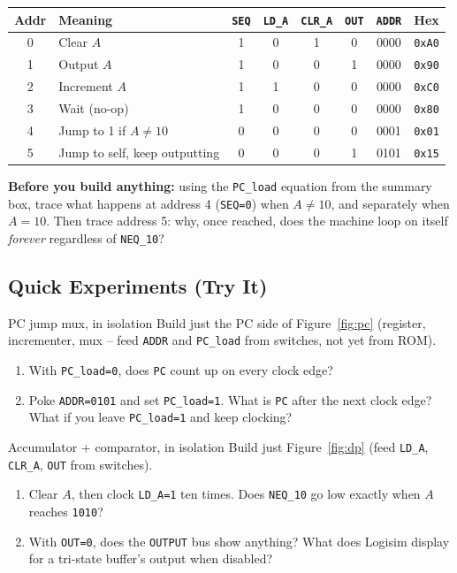 \documentclass[11pt]{article}
\begin{document}
\begin{center}
\begin{tabular}{@{}clccccc c@{}}
\toprule
\textbf{Addr} & \textbf{Meaning} & \texttt{SEQ} & \texttt{LD\_A} & \texttt{CLR\_A} & \texttt{OUT} & \texttt{ADDR} & \textbf{Hex} \\
\midrule
0 & Clear $A$                    & 1 & 0 & 1 & 0 & 0000 & \texttt{0xA0} \\
1 & Output $A$                   & 1 & 0 & 0 & 1 & 0000 & \texttt{0x90} \\
2 & Increment $A$                & 1 & 1 & 0 & 0 & 0000 & \texttt{0xC0} \\
3 & Wait (no-op)                 & 1 & 0 & 0 & 0 & 0000 & \texttt{0x80} \\
4 & Jump to 1 if $A \neq 10$     & 0 & 0 & 0 & 0 & 0001 & \texttt{0x01} \\
5 & Jump to self, keep outputting & 0 & 0 & 0 & 1 & 0101 & \texttt{0x15} \\
\bottomrule
\end{tabular}
\end{center}

\noindent\textbf{Before you build anything:} using the \texttt{PC\_load} equation
from the summary box, trace what happens at address 4 (\texttt{SEQ=0}) when
$A \neq 10$, and separately when $A = 10$. Then trace address 5: why, once
reached, does the machine loop on itself \emph{forever} regardless of
\texttt{NEQ\_10}?

\subsection*{Quick Experiments (Try It)}

\begin{tryit}{PC jump mux, in isolation}
Build just the PC side of Figure~\ref{fig:pc} (register, incrementer, mux -- feed
\texttt{ADDR} and \texttt{PC\_load} from switches, not yet from ROM).
\begin{enumerate}[nosep,leftmargin=*]
  \item With \texttt{PC\_load=0}, does \texttt{PC} count up on every clock edge?
  \item Poke \texttt{ADDR=0101} and set \texttt{PC\_load=1}. What is \texttt{PC}
        after the next clock edge? What if you leave \texttt{PC\_load=1} and keep
        clocking?
\end{enumerate}
\end{tryit}

\begin{tryit}{Accumulator + comparator, in isolation}
Build just Figure~\ref{fig:dp} (feed \texttt{LD\_A}, \texttt{CLR\_A}, \texttt{OUT}
from switches).
\begin{enumerate}[nosep,leftmargin=*]
  \item Clear $A$, then clock \texttt{LD\_A=1} ten times. Does \texttt{NEQ\_10} go
        low exactly when $A$ reaches \texttt{1010}?
  \item With \texttt{OUT=0}, does the \texttt{OUTPUT} bus show anything? What does
        Logisim display for a tri-state buffer's output when disabled?
\end{enumerate}
\end{tryit}
\end{document}
